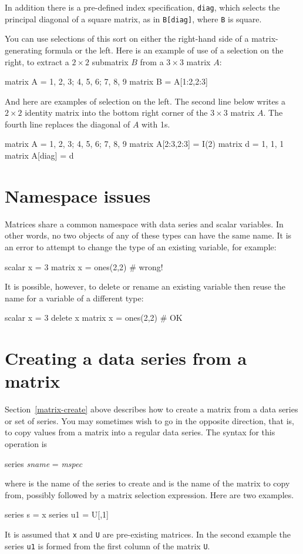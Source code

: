 In addition there is a pre-defined index specification, \texttt{diag},
which selects the principal diagonal of a square matrix, as in
\texttt{B[diag]}, where \texttt{B} is square.

You can use selections of this sort on either the right-hand side of
a matrix-generating formula or the left.  Here is an example of use of
a selection on the right, to extract a $2\times 2$ submatrix $B$ from a
$3\times 3$ matrix $A$:
%
\begin{code}
matrix A = { 1, 2, 3; 4, 5, 6; 7, 8, 9 }
matrix B = A[1:2,2:3]
\end{code}
%
And here are examples of selection on the left.  The second line below
writes a $2\times 2$ identity matrix into the bottom right corner of the
$3\times 3$ matrix $A$.  The fourth line replaces the diagonal of $A$ 
with 1s.
%
\begin{code}
matrix A = { 1, 2, 3; 4, 5, 6; 7, 8, 9 }
matrix A[2:3,2:3] = I(2)
matrix d = { 1, 1, 1 }
matrix A[diag] = d
\end{code}

\section{Namespace issues}
\label{matrix-namespace}

Matrices share a common namespace with data series and scalar
variables.  In other words, no two objects of any of these types can
have the same name.  It is an error to attempt to change the type of
an existing variable, for example:
%
\begin{code}
scalar x = 3
matrix x = ones(2,2) # wrong!
\end{code}
%
It is possible, however, to delete or rename an existing variable then
reuse the name for a variable of a different type:
\begin{code}
scalar x = 3
delete x
matrix x = ones(2,2) # OK
\end{code}


\section{Creating a data series from a matrix}
\label{matrix-create-series}

Section~\ref{matrix-create} above describes how to create a matrix
from a data series or set of series.  You may sometimes wish to go in
the opposite direction, that is, to copy values from a matrix 
into a regular data series.  The syntax for this operation is
%
\begin{textcode}
series \textsl{sname} = \textsl{mspec}
\end{textcode}
%
where  is the name of the series to create and
 is the name of the matrix to copy from, possibly followed
by a matrix selection expression.  Here are two examples.
%
\begin{code}
series s = x
series u1 = U[,1]
\end{code}
%
It is assumed that \texttt{x} and \texttt{U} are pre-existing
matrices.  In the second example the series \texttt{u1} is formed from
the first column of the matrix \texttt{U}.

